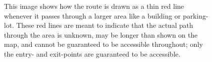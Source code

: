 \begin{figure}
	\centering
	\caption[Red path through areas]{This image shows how the route is drawn as a thin red line whenever it passes through a larger area like a building or parking-lot. These red lines are meant to indicate that the actual path through the area is unknown, may be longer than shown on the map, and cannot be guaranteed to be accessible throughout; only the entry- and exit-points are guaranteed to be accessible.}
	\label{fig:areaPath}
\end{figure}



